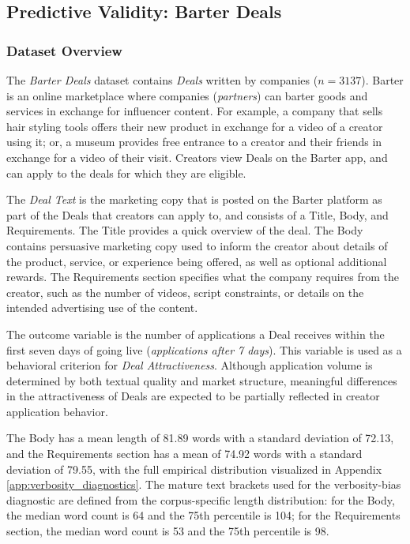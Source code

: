 \subsection{Predictive Validity: Barter Deals}

\subsubsection{Dataset Overview}


The \textit{Barter Deals} dataset contains \textit{Deals} written by companies ($n=3137$). Barter is an online marketplace where companies (\textit{partners}) can barter goods and services in exchange for influencer content. For example, a company that sells hair styling tools offers their new product in exchange for a video of a creator using it; or, a museum provides free entrance to a creator and their friends in exchange for a video of their visit. Creators view Deals on the Barter app, and can apply to the deals for which they are eligible. 

The \textit{Deal Text} is the marketing copy that is posted on the Barter platform as part of the Deals that creators can apply to, and consists of a Title, Body, and Requirements. The Title provides a quick overview of the deal. The Body contains persuasive marketing copy used to inform the creator about details of the product, service, or experience being offered, as well as optional additional rewards. The Requirements section specifies what the company requires from the creator, such as the number of videos, script constraints, or details on the intended advertising use of the content.

The outcome variable is the number of applications a Deal receives within the first seven days of going live (\textit{applications after 7 days}). This variable is used as a behavioral criterion for \textit{Deal Attractiveness}. Although application volume is determined by both textual quality and market structure, meaningful differences in the attractiveness of Deals are expected to be partially reflected in creator application behavior.

The Body has a mean length of 81.89 words with a standard deviation of 72.13, and the Requirements section has a mean of 74.92 words with a standard deviation of 79.55, with the full empirical distribution visualized in Appendix \ref{app:verbosity_diagnostics}. The mature text brackets used for the verbosity-bias diagnostic are defined from the corpus-specific length distribution: for the Body, the median word count is 64 and the 75th percentile is 104; for the Requirements section, the median word count is 53 and the 75th percentile is 98.

